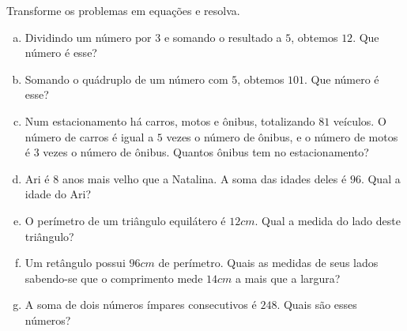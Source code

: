 \begin{secExercicios}

\begin{exer} Transforme os problemas em equações e resolva.
 \begin{enumerate}[a)]
\item Dividindo um número por $3$ e somando o resultado a $5$, obtemos $12$. Que número é esse?
\item Somando o quádruplo de um número com $5$, obtemos $101$. Que número é esse?
\item Num estacionamento há carros, motos e ônibus, totalizando $81$ veículos. O número de carros é igual a $5$ vezes o número de ônibus, e o número de motos é $3$ vezes o número de ônibus. Quantos ônibus tem no estacionamento?
\item Ari é 8 anos mais velho que a Natalina. A soma das idades deles é $96$. Qual a idade do Ari?
\item O perímetro de um triângulo equilátero é $12 cm$. Qual a medida do lado deste triângulo? 
\item Um retângulo possui $96 cm$ de perímetro. Quais as medidas de seus lados sabendo-se que o comprimento mede $14 cm$ a mais que a largura?
\item A soma de dois números ímpares consecutivos é $248$. Quais são esses números?
\end{enumerate}
\end{exer}
\begin{resp}
\begin{multicols}{2}
 \begin{enumerate}[a)]

\end{enumerate}
\end{multicols}
\end{resp}
\end{secExercicios}

